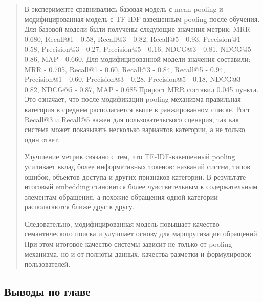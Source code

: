 \documentclass[
]{article}
\begin{document}
\begin{quote}
В эксперименте сравнивались базовая модель с mean pooling и
модифицированная модель с TF-IDF-взвешенным pooling после обучения. Для
базовой модели были получены следующие значения метрик: MRR - 0.680,
Recall@1 - 0.58, Recall@3 - 0.82, Recall@5 - 0.93, Precision@1 - 0.58,
Precision@3 - 0.27, Precision@5 - 0.16, NDCG@3 - 0.81, NDCG@5 - 0.86,
MAP - 0.660. Для модифицированной модели значения составили: MRR -
0.705, Recall@1 - 0.60, Recall@3 - 0.84, Recall@5 - 0.94, Precision@1 -
0.60, Precision@3 - 0.28, Precision@5 - 0.18, NDCG@3 - 0.82, NDCG@5 -
0.87, MAP - 0.685.Прирост MRR составил 0.045 пункта. Это означает, что
после модификации pooling-механизма правильная категория в среднем
располагается выше в ранжированном списке. Рост Recall@3 и Recall@5
важен для пользовательского сценария, так как система может показывать
несколько вариантов категории, а не только один ответ.

Улучшение метрик связано с тем, что TF-IDF-взвешенный pooling усиливает
вклад более информативных токенов: названий систем, типов ошибок,
объектов доступа и других признаков категории. В результате итоговый
embedding становится более чувствительным к содержательным элементам
обращения, а похожие обращения одной категории располагаются ближе друг
к другу.

Следовательно, модифицированная модель повышает качество семантического
поиска и улучшает основу для маршрутизации обращений. При этом итоговое
качество системы зависит не только от pooling-механизма, но и от полноты
данных, качества разметки и формулировок пользователей.
\end{quote}

\hypertarget{ux432ux44bux432ux43eux434ux44b-ux43fux43e-ux433ux43bux430ux432ux435}{%
\subsection{Выводы по
главе}\label{ux432ux44bux432ux43eux434ux44b-ux43fux43e-ux433ux43bux430ux432ux435}}
\end{document}
